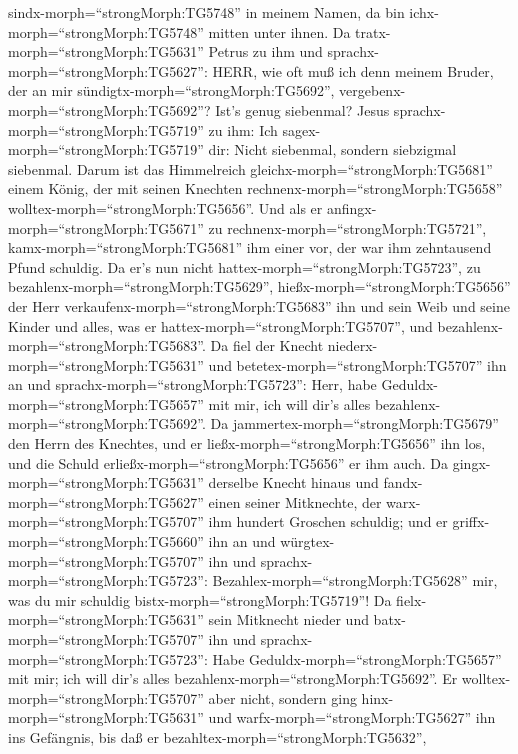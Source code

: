sindx-morph=``strongMorph:TG5748'' in meinem Namen, da bin
ichx-morph=``strongMorph:TG5748'' mitten unter ihnen.  Da
tratx-morph=``strongMorph:TG5631'' Petrus zu ihm und
sprachx-morph=``strongMorph:TG5627'': HERR, wie oft muß ich denn meinem
Bruder, der an mir sündigtx-morph=``strongMorph:TG5692'',
vergebenx-morph=``strongMorph:TG5692''? Ist's genug siebenmal?
 Jesus sprachx-morph=``strongMorph:TG5719'' zu ihm: Ich
sagex-morph=``strongMorph:TG5719'' dir: Nicht siebenmal, sondern
siebzigmal siebenmal.  Darum ist das Himmelreich
gleichx-morph=``strongMorph:TG5681'' einem König, der mit seinen
Knechten rechnenx-morph=``strongMorph:TG5658''
wolltex-morph=``strongMorph:TG5656''.  Und als er
anfingx-morph=``strongMorph:TG5671'' zu
rechnenx-morph=``strongMorph:TG5721'', kamx-morph=``strongMorph:TG5681''
ihm einer vor, der war ihm zehntausend Pfund schuldig.  Da
er's nun nicht hattex-morph=``strongMorph:TG5723'', zu
bezahlenx-morph=``strongMorph:TG5629'',
hießx-morph=``strongMorph:TG5656'' der Herr
verkaufenx-morph=``strongMorph:TG5683'' ihn und sein Weib und seine
Kinder und alles, was er hattex-morph=``strongMorph:TG5707'', und
bezahlenx-morph=``strongMorph:TG5683''.  Da fiel der Knecht
niederx-morph=``strongMorph:TG5631'' und
betetex-morph=``strongMorph:TG5707'' ihn an und
sprachx-morph=``strongMorph:TG5723'': Herr, habe
Geduldx-morph=``strongMorph:TG5657'' mit mir, ich will dir's alles
bezahlenx-morph=``strongMorph:TG5692''.  Da
jammertex-morph=``strongMorph:TG5679'' den Herrn des Knechtes, und er
ließx-morph=``strongMorph:TG5656'' ihn los, und die Schuld
erließx-morph=``strongMorph:TG5656'' er ihm auch.  Da
gingx-morph=``strongMorph:TG5631'' derselbe Knecht hinaus und
fandx-morph=``strongMorph:TG5627'' einen seiner Mitknechte, der
warx-morph=``strongMorph:TG5707'' ihm hundert Groschen schuldig; und er
griffx-morph=``strongMorph:TG5660'' ihn an und
würgtex-morph=``strongMorph:TG5707'' ihn und
sprachx-morph=``strongMorph:TG5723'':
Bezahlex-morph=``strongMorph:TG5628'' mir, was du mir schuldig
bistx-morph=``strongMorph:TG5719''!  Da
fielx-morph=``strongMorph:TG5631'' sein Mitknecht nieder und
batx-morph=``strongMorph:TG5707'' ihn und
sprachx-morph=``strongMorph:TG5723'': Habe
Geduldx-morph=``strongMorph:TG5657'' mit mir; ich will dir's alles
bezahlenx-morph=``strongMorph:TG5692''.  Er
wolltex-morph=``strongMorph:TG5707'' aber nicht, sondern ging
hinx-morph=``strongMorph:TG5631'' und warfx-morph=``strongMorph:TG5627''
ihn ins Gefängnis, bis daß er bezahltex-morph=``strongMorph:TG5632'',
